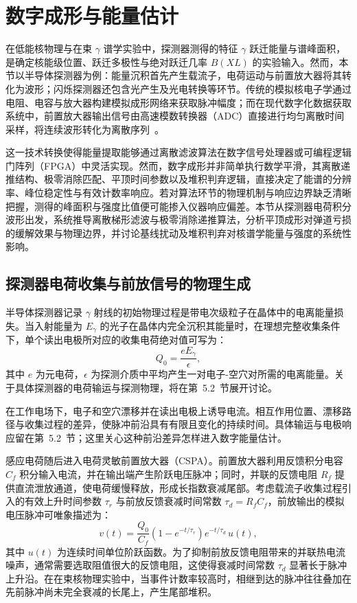 \section{数字成形与能量估计}\label{sec:5-3}

在低能核物理与在束 $\gamma$ 谱学实验中，探测器测得的特征 $\gamma$ 跃迁能量与谱峰面积，是确定核能级位置、跃迁多极性与绝对跃迁几率 $B(XL)$ 的实验输入。然而，本节以半导体探测器为例：能量沉积首先产生载流子，电荷运动与前置放大器将其转化为波形；闪烁探测器还包含光产生及光电转换等环节。传统的模拟核电子学通过电阻、电容与放大器构建模拟成形网络来获取脉冲幅度；而在现代数字化数据获取系统中，前置放大器输出信号由高速模数转换器（ADC）直接进行均匀离散时间采样，将连续波形转化为离散序列~\cite{wu-hongyi-2020-general-purpose-digital-daq-thesis, wu-2021-general-purpose-digital-daq-waveform-analysis}。

这一技术转换使得能量提取能够通过离散滤波算法在数字信号处理器或可编程逻辑门阵列（FPGA）中灵活实现。然而，数字成形并非简单执行数学平滑，其离散递推结构、极零消除匹配、平顶时间参数以及堆积判弃逻辑，直接决定了能谱的分辨率、峰位稳定性与有效计数率响应。若对算法环节的物理机制与响应边界缺乏清晰把握，测得的峰面积与强度比值便可能掺入仪器响应偏差。本节从探测器电荷积分波形出发，系统推导离散梯形滤波与极零消除递推算法，分析平顶成形对弹道亏损的缓解效果与物理边界，并讨论基线扰动及堆积判弃对核谱学能量与强度的系统性影响。

\subsection{探测器电荷收集与前放信号的物理生成}\label{subsec:5-3-1}

半导体探测器记录 $\gamma$ 射线的初始物理过程是带电次级粒子在晶体中的电离能量损失。当入射能量为 $E_\gamma$ 的光子在晶体内完全沉积其能量时，在理想完整收集条件下，单个读出电极所对应的收集电荷绝对值可写为：
\begin{equation}\label{eq:5-3-q0}
Q_0 = \frac{e E_\gamma}{\epsilon},
\end{equation}
其中 $e$ 为元电荷，$\epsilon$ 为探测介质中平均产生一对电子-空穴对所需的电离能量。关于具体探测器的电荷输运与探测物理，将在第~5.2~节展开讨论。

在工作电场下，电子和空穴漂移并在读出电极上诱导电流。相互作用位置、漂移路径与收集过程的差异，使脉冲前沿具有有限且变化的持续时间。具体输运与电极响应留在第~5.2~节；这里关心这种前沿差异怎样进入数字能量估计。

感应电荷随后进入电荷灵敏前置放大器（CSPA）。前置放大器利用反馈积分电容 $C_f$ 积分输入电流，并在输出端产生阶跃电压脉冲；同时，并联的反馈电阻 $R_f$ 提供直流泄放通道，使电荷缓慢释放，形成长指数衰减尾部。考虑载流子收集过程引入的有效上升时间参数 $\tau_r$ 与前放反馈衰减时间常数 $\tau_d = R_f C_f$，前放输出的模拟电压脉冲可唯象描述为：
\begin{equation}\label{eq:5-3-vt}
v(t) = \frac{Q_0}{C_f} \left(1 - e^{-t/\tau_r}\right) e^{-t/\tau_d} \, u(t),
\end{equation}
其中 $u(t)$ 为连续时间单位阶跃函数。为了抑制前放反馈电阻带来的并联热电流噪声，通常需要选取阻值很大的反馈电阻，这使得衰减时间常数 $\tau_d$ 显著长于脉冲上升沿。在在束核物理实验中，当事件计数率较高时，相继到达的脉冲往往叠加在先前脉冲尚未完全衰减的长尾上，产生尾部堆积。

